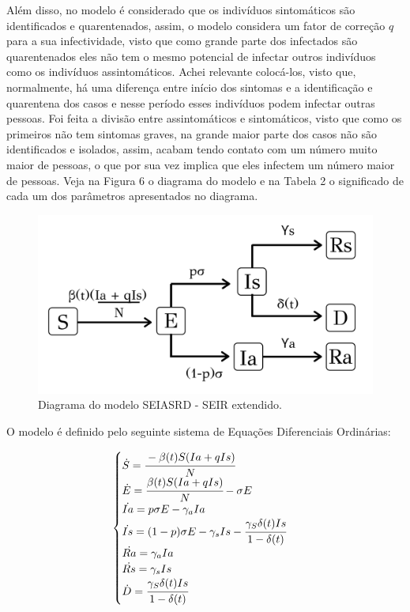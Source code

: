 \documentclass[12pt]{article}
\begin{document}
Além disso, no modelo é considerado que os indivíduos sintomáticos são identificados e quarentenados, assim, o modelo considera um fator de correção $q$ para a sua infectividade, visto que como grande parte dos infectados são quarentenados eles não tem o mesmo potencial de infectar outros indivíduos como os indivíduos assintomáticos. Achei relevante colocá-los, visto que, normalmente, há uma diferença entre início dos sintomas e a identificação e  quarentena dos casos e nesse período esses indivíduos podem infectar outras pessoas. Foi feita a divisão entre assintomáticos e sintomáticos, visto que como os primeiros não tem sintomas graves, na grande maior parte dos casos não são identificados e isolados, assim, acabam tendo contato com um número muito maior de pessoas, o que por sua vez implica que eles infectem um número maior de pessoas. Veja na Figura 6 o diagrama do modelo e na Tabela 2 o significado de cada um dos parâmetros apresentados no diagrama.

\begin{figure}[h!]
    \centering
    \includegraphics[scale = 0.35]{Diagrama Modelo.png}
    \caption{Diagrama do modelo SEIASRD - SEIR extendido.}
\end{figure}


O modelo é definido pelo seguinte sistema de Equações Diferenciais Ordinárias:

\begin{center}
$$
\begin{cases}
\dot S = \cfrac{-\beta(t)S(Ia + qIs)}{N} \\
\dot E = \cfrac{\beta(t)S(Ia + qIs)}{N} - \sigma E \\
\dot {Ia} = p\sigma E - \gamma_aIa\\
\dot {Is} = (1-p)\sigma E - \gamma_sIs - \cfrac{\gamma_S \delta (t)Is}{1 - \delta(t)}\\
\dot {Ra} = \gamma_aIa\\
\dot {Rs} = \gamma_sIs\\
\dot {D} = \cfrac{\gamma_S \delta (t)Is}{1 - \delta(t)}

\end{cases}
$$
\end{center}
\end{document}
